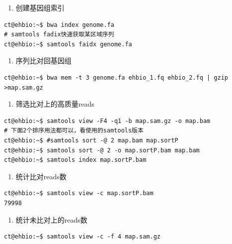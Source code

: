 \documentclass[]{article}
\providecommand{\tightlist}{%
  \setlength{\itemsep}{0pt}\setlength{\parskip}{0pt}}
\numberwithin{figure}{section}
\numberwithin{table}{section}
\begin{document}
\begin{enumerate}
\def\labelenumi{\arabic{enumi}.}
\setcounter{enumi}{3}
\tightlist
\item
  创建基因组索引
\end{enumerate}

\begin{verbatim}
ct@ehbio:~$ bwa index genome.fa
# samtools fadix快速获取某区域序列
ct@ehbio:~$ samtools faidx genome.fa
\end{verbatim}

\begin{enumerate}
\def\labelenumi{\arabic{enumi}.}
\setcounter{enumi}{4}
\tightlist
\item
  序列比对回基因组
\end{enumerate}

\begin{verbatim}
ct@ehbio:~$ bwa mem -t 3 genome.fa ehbio_1.fq ehbio_2.fq | gzip >map.sam.gz
\end{verbatim}

\begin{enumerate}
\def\labelenumi{\arabic{enumi}.}
\setcounter{enumi}{5}
\tightlist
\item
  筛选比对上的高质量reads
\end{enumerate}

\begin{verbatim}
ct@ehbio:~$ samtools view -F4 -q1 -b map.sam.gz -o map.bam
# 下面2个排序用法都可以，看使用的samtools版本
ct@ehbio:~$ #samtools sort -@ 2 map.bam map.sortP
ct@ehbio:~$ samtools sort -@ 2 -o map.sortP.bam map.bam
ct@ehbio:~$ samtools index map.sortP.bam
\end{verbatim}

\begin{enumerate}
\def\labelenumi{\arabic{enumi}.}
\setcounter{enumi}{6}
\tightlist
\item
  统计比对reads数
\end{enumerate}

\begin{verbatim}
ct@ehbio:~$ samtools view -c map.sortP.bam
79998
\end{verbatim}

\begin{enumerate}
\def\labelenumi{\arabic{enumi}.}
\setcounter{enumi}{7}
\tightlist
\item
  统计未比对上的reads数
\end{enumerate}

\begin{verbatim}
ct@ehbio:~$ samtools view -c -f 4 map.sam.gz
\end{verbatim}
\end{document}
